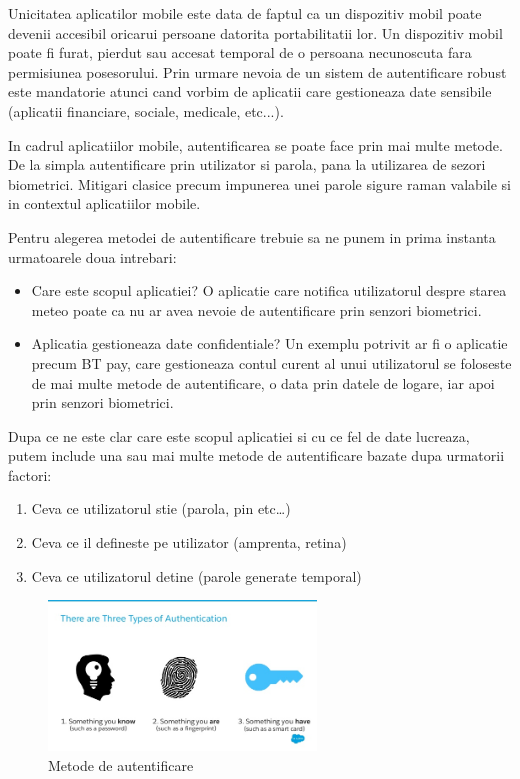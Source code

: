 \documentclass[a4paper]{article}
\begin{document}
Unicitatea aplicatilor mobile este data de faptul ca un dispozitiv mobil
poate devenii accesibil oricarui persoane datorita portabilitatii lor. Un dispozitiv mobil
poate fi furat, pierdut sau accesat temporal de o persoana necunoscuta fara permisiunea
posesorului. Prin urmare nevoia de un sistem de autentificare robust este mandatorie 
atunci cand vorbim de aplicatii care gestioneaza date sensibile (aplicatii financiare, sociale,
medicale, etc...).

\bigskip

In cadrul aplicatiilor mobile, autentificarea se poate face prin mai multe metode. De la
simpla autentificare prin utilizator si parola, pana la utilizarea de sezori biometrici.
Mitigari clasice precum impunerea unei parole sigure raman valabile si in 
contextul aplicatiilor mobile.


Pentru alegerea metodei de autentificare trebuie sa ne punem in prima instanta urmatoarele doua
intrebari:

\begin{itemize}
    \item Care este scopul aplicatiei? O aplicatie care notifica utilizatorul despre starea meteo poate 
    ca nu ar avea nevoie de autentificare prin senzori biometrici. 
    \item Aplicatia gestioneaza date confidentiale? Un exemplu potrivit ar fi o aplicatie precum BT pay, care gestioneaza 
    contul curent al unui utilizatorul
    se foloseste de mai multe metode de autentificare, o data prin datele de logare, iar apoi
    prin senzori biometrici.
\end{itemize}

Dupa ce ne este clar care este scopul aplicatiei si cu ce fel de date lucreaza, 
putem include una sau mai multe metode de autentificare bazate dupa urmatorii
factori:

\begin{enumerate}
    \item Ceva ce utilizatorul stie (parola, pin etc\dots)
    \item Ceva ce il defineste pe utilizator (amprenta, retina)
    \item Ceva ce utilizatorul detine (parole generate temporal)
\end{enumerate}

\begin{figure}[H]
\centering
\includegraphics[height=4cm]{3ways.jpg}
\caption{Metode de autentificare \cite{3ways-auth}}
\end{figure}
\end{document}
